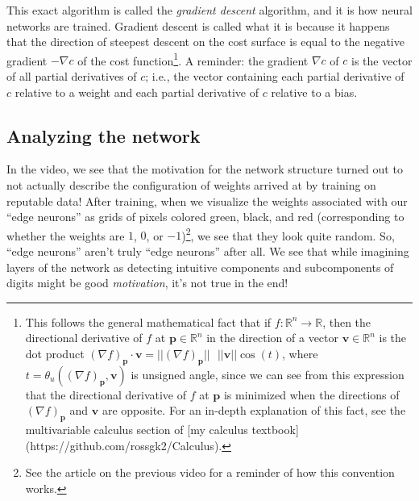 \documentclass{article}
\begin{document}
	This exact algorithm is called the \textit{gradient descent} algorithm, and it is how neural networks are trained. Gradient descent is called what it is because it happens that the direction of steepest descent on the cost surface is equal to the negative gradient $-\nabla c$ of the cost function\footnote{This follows the general mathematical fact that if $f:\mathbb{R}^n \rightarrow \mathbb{R}$, then the directional derivative of $f$ at $\mathbf{p} \in \mathbb{R}^n$ in the direction of a vector $\mathbf{v} \in \mathbb{R}^n$ is the dot product $(\nabla f)_{\mathbf{p}} \cdot \mathbf{v} = ||(\nabla f)_{\mathbf{p}}|| \text{ } ||\mathbf{v}|| \cos(t)$, where $t = \theta_u((\nabla f)_{\mathbf{p}}, \mathbf{v})$ is unsigned angle, since we can see from this expression that the directional derivative of $f$ at $\mathbf{p}$ is minimized when the directions of $(\nabla f)_{\mathbf{p}}$ and $\mathbf{v}$ are opposite. For an in-depth explanation of this fact, see the multivariable calculus section of [my calculus textbook](https://github.com/rossgk2/Calculus).}. A reminder: the gradient $\nabla c$ of $c$ is the vector of all partial derivatives of $c$; i.e., the vector containing each partial derivative of $c$ relative to a weight and each partial derivative of $c$ relative to a bias.
	
	\subsection*{Analyzing the network}
	
	In the video, we see that the motivation for the network structure turned out to not actually describe the configuration of weights arrived at by training on reputable data! After training, when we visualize the weights associated with our ``edge neurons'' as grids of pixels colored green, black, and red (corresponding to whether the weights are $1$, $0$, or $-1$)\footnote{See the article on the previous video for a reminder of how this convention works.}, we see that they look quite random. So, ``edge neurons'' aren't truly ``edge neurons'' after all. We see that while imagining layers of the network as detecting intuitive components and subcomponents of digits might be good \textit{motivation}, it's not true in the end!
\end{document}
